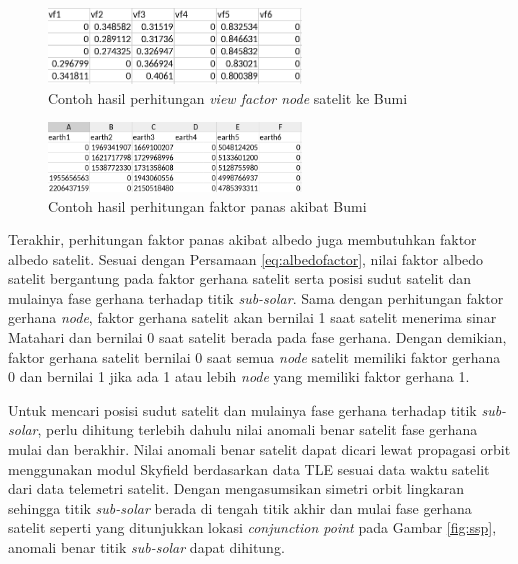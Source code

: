 \begin{figure}[H]
\setlength{}
\begin{center}
\includegraphics[width=0.6\textwidth]{fig/vffig.png}
\caption{Contoh hasil perhitungan \textit{view factor node} satelit ke Bumi}
\label{fig:vffig}
\end{center}
\end{figure}

\begin{figure}[H]
\setlength{}
\begin{center}
\includegraphics[width=0.6\textwidth]{fig/earthfactor.png}
\caption{Contoh hasil perhitungan faktor panas akibat Bumi}
\label{fig:earthfactor}
\end{center}
\end{figure}

Terakhir, perhitungan faktor panas akibat albedo juga membutuhkan faktor albedo
satelit. Sesuai dengan Persamaan \ref{eq:albedofactor}, nilai faktor albedo
satelit bergantung pada faktor gerhana satelit serta posisi sudut satelit dan
mulainya fase gerhana terhadap titik \textit{sub-solar}. Sama dengan
perhitungan faktor gerhana \textit{node}, faktor gerhana satelit akan bernilai
1 saat satelit menerima sinar Matahari dan bernilai 0 saat satelit berada pada
fase gerhana. Dengan demikian, faktor gerhana satelit bernilai 0 saat semua
\textit{node} satelit memiliki faktor gerhana 0 dan bernilai 1 jika ada 1 atau
lebih \textit{node} yang memiliki faktor gerhana 1.

Untuk mencari posisi sudut satelit dan mulainya fase gerhana terhadap titik
\textit{sub-solar}, perlu dihitung terlebih dahulu nilai anomali benar satelit
fase gerhana mulai dan berakhir. Nilai anomali benar satelit dapat dicari lewat
propagasi orbit menggunakan modul Skyfield berdasarkan data TLE sesuai data
waktu satelit dari data telemetri satelit. Dengan mengasumsikan simetri orbit
lingkaran sehingga titik \textit{sub-solar} berada di tengah titik akhir dan mulai fase gerhana satelit seperti yang ditunjukkan lokasi \textit{conjunction point} pada Gambar \ref{fig:ssp}, anomali benar titik \textit{sub-solar} dapat dihitung.

